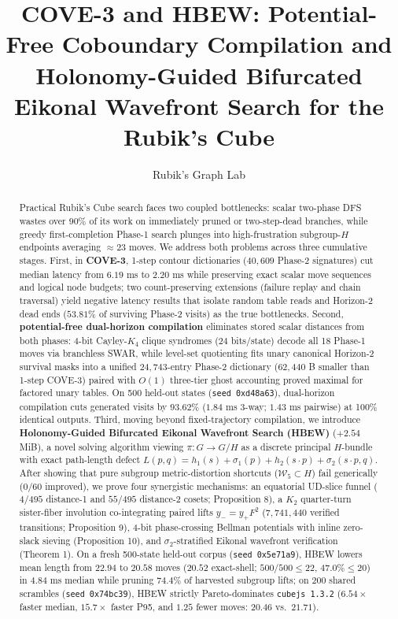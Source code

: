 \documentclass[10pt,twocolumn,letterpaper]{article}
\title{COVE-3 and HBEW: Potential-Free Coboundary Compilation and\\
Holonomy-Guided Bifurcated Eikonal Wavefront Search for the Rubik's Cube}
\author{Rubik's Graph Lab}
\begin{document}
\maketitle
\begin{abstract}

Practical Rubik's Cube search faces two coupled bottlenecks: scalar
two-phase DFS wastes over \(90\%\) of its work on immediately pruned or
two-step-dead branches, while greedy first-completion Phase-1 search
plunges into high-frustration subgroup-\(H\) endpoints averaging
\(\approx 23\) moves. We address both problems across three cumulative
stages. First, in \textbf{COVE-3}, 1-step contour dictionaries
(\(40,609\) Phase-2 signatures) cut median latency from \(6.19\) ms to
\(2.20\) ms while preserving exact scalar move sequences and logical
node budgets; two count-preserving extensions (failure replay and chain
traversal) yield negative latency results that isolate random table
reads and Horizon-2 dead ends (\(53.81\%\) of surviving Phase-2 visits)
as the true bottlenecks. Second, \textbf{potential-free dual-horizon
compilation} eliminates stored scalar distances from both phases: 4-bit
Cayley-\(K_4\) clique syndromes (\(24\) bits/state) decode all 18
Phase-1 moves via branchless SWAR, while level-set quotienting fits
unary canonical Horizon-2 survival masks into a unified \(24,743\)-entry
Phase-2 dictionary (\(62,440\) B smaller than 1-step COVE-3) paired with
\(O(1)\) three-tier ghost accounting proved maximal for factored unary
tables. On 500 held-out states (\texttt{seed\ 0xd48a63}), dual-horizon
compilation cuts generated visits by \(93.62\%\) (\(1.84\) ms 3-way;
\(1.43\) ms pairwise) at 100\% identical outputs. Third, moving beyond
fixed-trajectory compilation, we introduce \textbf{Holonomy-Guided
Bifurcated Eikonal Wavefront Search (HBEW)} (\(+2.54\) MiB), a novel
solving algorithm viewing \(\pi: G \to G/H\) as a discrete principal
\(H\)-bundle with exact path-length defect
\(L(p,q)=h_1(s)+\sigma_1(p)+h_2(s\cdot p)+\sigma_2(s\cdot p,q)\). After
showing that pure subgroup metric-distortion shortcuts
(\(\mathcal W_5 \subset H\)) fail generically (\(0/60\) improved), we
prove four synergistic mechanisms: an equatorial UD-slice funnel
(\(4/495\) distance-1 and \(55/495\) distance-2 cosets; Proposition 8),
a \(K_2\) quarter-turn sister-fiber involution co-integrating paired
lifts \(y_- = y_+ F^2\) (\(7,741,440\) verified transitions; Proposition
9), 4-bit phase-crossing Bellman potentials with inline zero-slack
sieving (Proposition 10), and \(\sigma_2\)-stratified Eikonal wavefront
verification (Theorem 1). On a fresh 500-state held-out corpus
(\texttt{seed\ 0x5e71a9}), HBEW lowers mean length from \(22.94\) to
\(20.58\) moves (\(20.52\) exact-shell; \(500/500 \le 22\),
\(47.0\% \le 20\)) in \(4.84\) ms median while pruning \(74.4\%\) of
harvested subgroup lifts; on 200 shared scrambles
(\texttt{seed\ 0x74bc39}), HBEW strictly Pareto-dominates
\texttt{cubejs\ 1.3.2} (\(6.54\times\) faster median, \(15.7\times\)
faster P95, and \(1.25\) fewer moves: \(20.46\) vs.~\(21.71\)).

\end{abstract}
\end{document}
